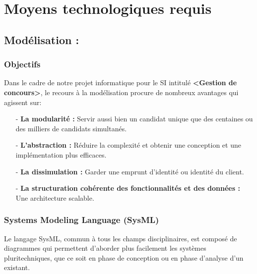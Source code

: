 \section{Moyens technologiques requis}
\subsection{Modélisation :}
\setlength{\parindent}{5ex}
\subsubsection{Objectifs}

Dans le cadre de notre projet informatique pour le SI intitulé \textbf{<Gestion de concours>}, le recours à la modélisation procure de nombreux
avantages qui agissent sur:

\begin{itemize}
	\item[-] \textbf{La modularité :} Servir aussi bien un candidat unique que des centaines ou des milliers de candidats simultanés.
	\item[]
	\item[-] \textbf{L’abstraction  :} Réduire la complexité et obtenir une conception et une implémentation plus efficaces.
	\item[]
	\item[-] \textbf{La dissimulation :} Garder une emprunt d’identité ou identité du client.
	\item[]
	\item[-] \textbf{La structuration cohérente des fonctionnalités et des données :} Une architecture scalable.
\end{itemize}

\setlength{\parindent}{20pt}
\setlength{\parskip}{1em}

\subsubsection{Systems Modeling Language (SysML)}

Le langage SysML, commun à tous les champs disciplinaires, est composé de diagrammes qui permettent d’aborder
plus facilement les systèmes pluritechniques, que ce soit en phase de conception ou en phase d’analyse d’un existant.\par

